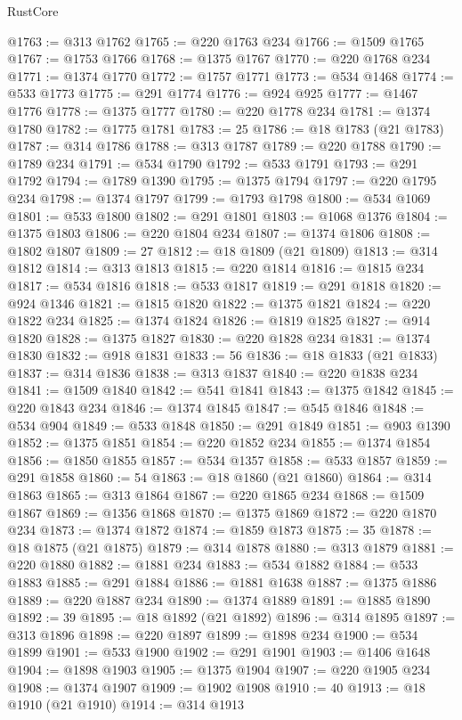 \begin{lexlean}{RustCore}
\begin{coremodule}
@1763 := @313 @1762
@1765 := @220 @1763 @234
@1766 := @1509 @1765
@1767 := @1753 @1766
@1768 := @1375 @1767
@1770 := @220 @1768 @234
@1771 := @1374 @1770
@1772 := @1757 @1771
@1773 := @534 @1468
@1774 := @533 @1773
@1775 := @291 @1774
@1776 := @924 @925
@1777 := @1467 @1776
@1778 := @1375 @1777
@1780 := @220 @1778 @234
@1781 := @1374 @1780
@1782 := @1775 @1781
@1783 := 25
@1786 := @18 @1783 (@21 @1783)
@1787 := @314 @1786
@1788 := @313 @1787
@1789 := @220 @1788
@1790 := @1789 @234
@1791 := @534 @1790
@1792 := @533 @1791
@1793 := @291 @1792
@1794 := @1789 @1390
@1795 := @1375 @1794
@1797 := @220 @1795 @234
@1798 := @1374 @1797
@1799 := @1793 @1798
@1800 := @534 @1069
@1801 := @533 @1800
@1802 := @291 @1801
@1803 := @1068 @1376
@1804 := @1375 @1803
@1806 := @220 @1804 @234
@1807 := @1374 @1806
@1808 := @1802 @1807
@1809 := 27
@1812 := @18 @1809 (@21 @1809)
@1813 := @314 @1812
@1814 := @313 @1813
@1815 := @220 @1814
@1816 := @1815 @234
@1817 := @534 @1816
@1818 := @533 @1817
@1819 := @291 @1818
@1820 := @924 @1346
@1821 := @1815 @1820
@1822 := @1375 @1821
@1824 := @220 @1822 @234
@1825 := @1374 @1824
@1826 := @1819 @1825
@1827 := @914 @1820
@1828 := @1375 @1827
@1830 := @220 @1828 @234
@1831 := @1374 @1830
@1832 := @918 @1831
@1833 := 56
@1836 := @18 @1833 (@21 @1833)
@1837 := @314 @1836
@1838 := @313 @1837
@1840 := @220 @1838 @234
@1841 := @1509 @1840
@1842 := @541 @1841
@1843 := @1375 @1842
@1845 := @220 @1843 @234
@1846 := @1374 @1845
@1847 := @545 @1846
@1848 := @534 @904
@1849 := @533 @1848
@1850 := @291 @1849
@1851 := @903 @1390
@1852 := @1375 @1851
@1854 := @220 @1852 @234
@1855 := @1374 @1854
@1856 := @1850 @1855
@1857 := @534 @1357
@1858 := @533 @1857
@1859 := @291 @1858
@1860 := 54
@1863 := @18 @1860 (@21 @1860)
@1864 := @314 @1863
@1865 := @313 @1864
@1867 := @220 @1865 @234
@1868 := @1509 @1867
@1869 := @1356 @1868
@1870 := @1375 @1869
@1872 := @220 @1870 @234
@1873 := @1374 @1872
@1874 := @1859 @1873
@1875 := 35
@1878 := @18 @1875 (@21 @1875)
@1879 := @314 @1878
@1880 := @313 @1879
@1881 := @220 @1880
@1882 := @1881 @234
@1883 := @534 @1882
@1884 := @533 @1883
@1885 := @291 @1884
@1886 := @1881 @1638
@1887 := @1375 @1886
@1889 := @220 @1887 @234
@1890 := @1374 @1889
@1891 := @1885 @1890
@1892 := 39
@1895 := @18 @1892 (@21 @1892)
@1896 := @314 @1895
@1897 := @313 @1896
@1898 := @220 @1897
@1899 := @1898 @234
@1900 := @534 @1899
@1901 := @533 @1900
@1902 := @291 @1901
@1903 := @1406 @1648
@1904 := @1898 @1903
@1905 := @1375 @1904
@1907 := @220 @1905 @234
@1908 := @1374 @1907
@1909 := @1902 @1908
@1910 := 40
@1913 := @18 @1910 (@21 @1910)
@1914 := @314 @1913

\end{coremodule}
\end{lexlean}
